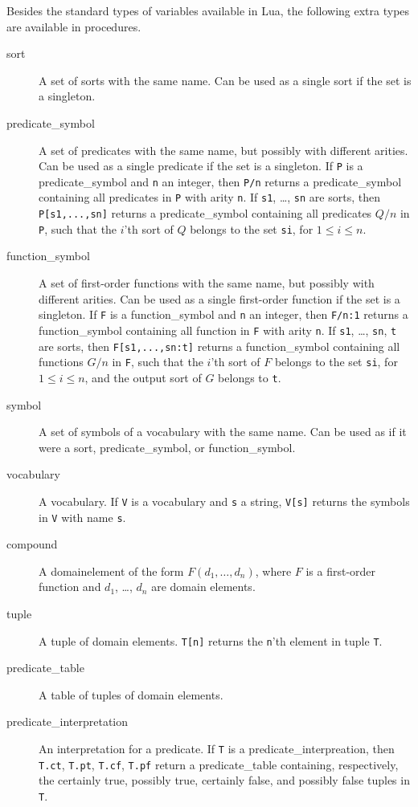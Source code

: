 \documentclass[a4]{article}
\begin{document}
Besides the standard types of variables available in Lua, the following extra types are available in \idp procedures.
\begin{description}
	\item[sort] A set of sorts with the same name. Can be used as a single sort if the set is a singleton.
	\item[predicate\_symbol] A set of predicates with the same name, but possibly with different arities. Can be used as a single predicate if the set is a singleton. If {\tt P} is a predicate\_symbol and {\tt n} an integer, then {\tt P/n} returns a predicate\_symbol containing all predicates in {\tt P} with arity {\tt n}. If {\tt s1}, \ldots, {\tt sn} are sorts, then {\tt P[s1,...,sn]} returns a predicate\_symbol containing all predicates $Q/n$ in {\tt P}, such that the $i$'th sort of $Q$ belongs to the set {\tt si}, for $1 \leq i \leq n$.
	\item[function\_symbol] A set of first-order functions with the same name, but possibly with different arities. Can be used as a single first-order function if the set is a singleton. If {\tt F} is a function\_symbol and {\tt n} an integer, then {\tt F/n:1} returns a function\_symbol containing all function in {\tt F} with arity {\tt n}. If {\tt s1}, \ldots, {\tt sn}, {\tt t} are sorts, then {\tt F[s1,...,sn:t]} returns a function\_symbol containing all functions $G/n$ in {\tt F}, such that the $i$'th sort of $F$ belongs to the set {\tt si}, for $1 \leq i \leq n$, and the output sort of $G$ belongs to {\tt t}.
	\item[symbol] A set of symbols of a vocabulary with the same name. Can be used as if it were a sort, predicate\_symbol, or function\_symbol.
	\item[vocabulary] A vocabulary. If {\tt V} is a vocabulary and {\tt s} a string, {\tt V[s]} returns the symbols in {\tt V} with name {\tt s}. 
	\item[compound] A domainelement of the form $F(d_1,\ldots,d_n)$, where $F$ is a first-order function and $d_1$, \ldots, $d_n$ are domain elements.
	\item[tuple] A tuple of domain elements. {\tt T[n]} returns the {\tt n}'th element in tuple {\tt T}.
	\item[predicate\_table] A table of tuples of domain elements.
	\item[predicate\_interpretation] An interpretation for a predicate. If {\tt T} is a predicate\_interpreation, then {\tt T.ct}, {\tt T.pt}, {\tt T.cf}, {\tt T.pf} return a predicate\_table containing, respectively, the certainly true, possibly true, certainly false, and possibly false tuples in {\tt T}. %

\end{description}
\end{document}
